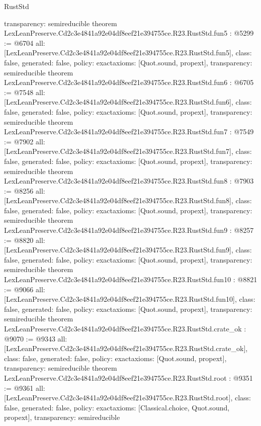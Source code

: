 \begin{lexlean}{RustStd}
\begin{coremodule}
{  transparency: semireducible
}
theorem LexLeanPreserve.Cd2c3e4841a92e04df8eef21e394755ce.R23.RustStd.fun5 : @5299 := @6704 {
  all: [LexLeanPreserve.Cd2c3e4841a92e04df8eef21e394755ce.R23.RustStd.fun5],
  class: false,
  generated: false,
  policy: exact{axioms: [Quot.sound, propext]},
  transparency: semireducible
}
theorem LexLeanPreserve.Cd2c3e4841a92e04df8eef21e394755ce.R23.RustStd.fun6 : @6705 := @7548 {
  all: [LexLeanPreserve.Cd2c3e4841a92e04df8eef21e394755ce.R23.RustStd.fun6],
  class: false,
  generated: false,
  policy: exact{axioms: [Quot.sound, propext]},
  transparency: semireducible
}
theorem LexLeanPreserve.Cd2c3e4841a92e04df8eef21e394755ce.R23.RustStd.fun7 : @7549 := @7902 {
  all: [LexLeanPreserve.Cd2c3e4841a92e04df8eef21e394755ce.R23.RustStd.fun7],
  class: false,
  generated: false,
  policy: exact{axioms: [Quot.sound, propext]},
  transparency: semireducible
}
theorem LexLeanPreserve.Cd2c3e4841a92e04df8eef21e394755ce.R23.RustStd.fun8 : @7903 := @8256 {
  all: [LexLeanPreserve.Cd2c3e4841a92e04df8eef21e394755ce.R23.RustStd.fun8],
  class: false,
  generated: false,
  policy: exact{axioms: [Quot.sound, propext]},
  transparency: semireducible
}
theorem LexLeanPreserve.Cd2c3e4841a92e04df8eef21e394755ce.R23.RustStd.fun9 : @8257 := @8820 {
  all: [LexLeanPreserve.Cd2c3e4841a92e04df8eef21e394755ce.R23.RustStd.fun9],
  class: false,
  generated: false,
  policy: exact{axioms: [Quot.sound, propext]},
  transparency: semireducible
}
theorem LexLeanPreserve.Cd2c3e4841a92e04df8eef21e394755ce.R23.RustStd.fun10 : @8821 := @9066 {
  all: [LexLeanPreserve.Cd2c3e4841a92e04df8eef21e394755ce.R23.RustStd.fun10],
  class: false,
  generated: false,
  policy: exact{axioms: [Quot.sound, propext]},
  transparency: semireducible
}
theorem LexLeanPreserve.Cd2c3e4841a92e04df8eef21e394755ce.R23.RustStd.crate_ok : @9070 := @9343 {
  all: [LexLeanPreserve.Cd2c3e4841a92e04df8eef21e394755ce.R23.RustStd.crate_ok],
  class: false,
  generated: false,
  policy: exact{axioms: [Quot.sound, propext]},
  transparency: semireducible
}
theorem LexLeanPreserve.Cd2c3e4841a92e04df8eef21e394755ce.R23.RustStd.root : @9351 := @9361 {
  all: [LexLeanPreserve.Cd2c3e4841a92e04df8eef21e394755ce.R23.RustStd.root],
  class: false,
  generated: false,
  policy: exact{axioms: [Classical.choice, Quot.sound, propext]},
  transparency: semireducible
}


\end{coremodule}
\end{lexlean}
